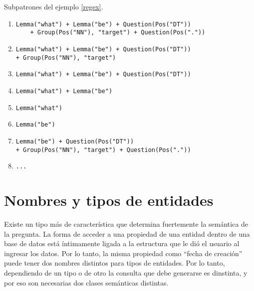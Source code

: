 \begin{example} Subpatrones del ejemplo \ref{regex}.
\begin{enumerate}
\item \begin{lstlisting}
Lemma("what") + Lemma("be") + Question(Pos("DT"))
    + Group(Pos("NN"), "target") + Question(Pos("."))
\end{lstlisting}

\item
\begin{lstlisting}
Lemma("what") + Lemma("be") + Question(Pos("DT"))
+ Group(Pos("NN"), "target")
\end{lstlisting}

\item
\begin{lstlisting}
Lemma("what") + Lemma("be") + Question(Pos("DT"))
\end{lstlisting}

\item
\begin{lstlisting}
Lemma("what") + Lemma("be")
\end{lstlisting}

\item
\begin{lstlisting}
Lemma("what")
\end{lstlisting}

\item
\begin{lstlisting}
Lemma("be")
\end{lstlisting}

\item
\begin{lstlisting}
Lemma("be") + Question(Pos("DT"))
+ Group(Pos("NN"), "target") + Question(Pos("."))
\end{lstlisting}

\item
\begin{lstlisting}
...
\end{lstlisting}
\end{enumerate}

\end{example}

\section{Nombres y tipos de entidades}

Existe un tipo más de característica que determina fuertemente la semántica de la pregunta. La forma de acceder a una propiedad de una entidad dentro de una base de datos está íntimamente ligada a la estructura que le dió el usuario al ingresar los datos. Por lo tanto, la misma propiedad como ``fecha de creación'' puede tener dos nombres distintos para tipos de entidades. Por lo tanto, dependiendo de un tipo o de otro la consulta que debe generarse es dinstinta, y por eso son necesarias dos clases semánticas distintas.

